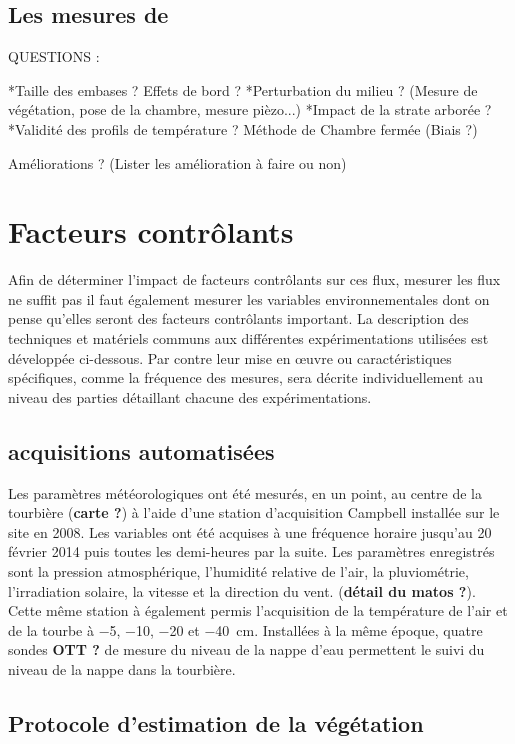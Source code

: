 \subsection{Les mesures de \chh}

QUESTIONS :

*Taille des embases ? Effets de bord ?
*Perturbation du milieu ? (Mesure de végétation, pose de la chambre, mesure pièzo...)
*Impact de la strate arborée ?
*Validité des profils de température ?
Méthode de Chambre fermée (Biais ?)

Améliorations ? (Lister les amélioration à faire ou non)


\section{Facteurs contrôlants}
Afin de déterminer l'impact de facteurs contrôlants sur ces flux, mesurer les flux ne suffit pas il faut également mesurer les variables environnementales dont on pense qu'elles seront des facteurs contrôlants important.
La description des techniques et matériels communs aux différentes expérimentations utilisées est développée ci-dessous.
Par contre leur mise en œuvre ou caractéristiques spécifiques, comme la fréquence des mesures, sera décrite individuellement au niveau des parties détaillant chacune des expérimentations.

\subsection{acquisitions automatisées}

Les paramètres météorologiques ont été mesurés, en un point, au centre de la tourbière (\textbf{carte ?}) à l'aide d'une station d'acquisition Campbell installée sur le site en 2008.
Les variables ont été acquises à une fréquence horaire jusqu'au 20 février 2014 puis toutes les demi-heures par la suite. 
Les paramètres enregistrés sont la pression atmosphérique, l'humidité relative de l'air, la pluviométrie, l'irradiation solaire, la vitesse et la direction du vent. (\textbf{détail du matos ?}).
Cette même station à également permis l'acquisition de la température de l'air et de la tourbe à \num{-5}, \num{-10}, \num{-20} et \SIlist{-40}{\cm}.
Installées à la même époque, quatre sondes \textbf{OTT ?} de mesure du niveau de la nappe d'eau permettent le suivi du niveau de la nappe dans la tourbière.

\subsection{Protocole d'estimation de la végétation}

